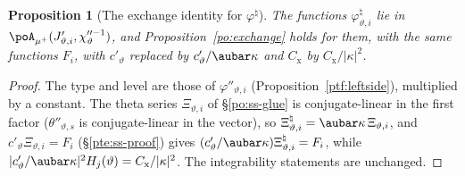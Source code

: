 \documentclass[10pt]{amsart}
\newtheorem{proposition}[theorem]{Proposition}
\theoremstyle{definition}
\theoremstyle{remark}
\begin{document}
\begin{proposition}[The exchange identity for $\varphi^\natural$]\label{pfq:exchange}
The functions $\varphi^\natural_{\vartheta,i}$ lie in $\poA_{\mu^+}(J'_{\vartheta,i},\chi''^{-1}_\vartheta)$, and Proposition~\ref{po:exchange} holds for
them, with the same functions $F_i$, with $c'_\vartheta$ replaced by $c'_\vartheta/\aubar\kappa$ and $C_{\mathrm x}$ by $C_{\mathrm x}/|\kappa|^2$.
\end{proposition}
\begin{proof}
The type and level are those of $\varphi''_{\vartheta,i}$ (Proposition~\ref{ptf:leftside}), multiplied by a constant. The theta series
$\Xi_{\vartheta,i}$ of \S\ref{po:ss-glue} is conjugate-linear in the first factor ($\theta''_{\vartheta,s}$ is conjugate-linear in the
vector), so $\Xi^\natural_{\vartheta,i}=\aubar\kappa\,\Xi_{\vartheta,i}$, and $c'_\vartheta\Xi_{\vartheta,i}=F_i$ (\S\ref{pte:ss-proof}) gives
$(c'_\vartheta/\aubar\kappa)\Xi^\natural_{\vartheta,i}=F_i$, while $|c'_\vartheta/\aubar\kappa|^2H_j(\vartheta)=C_{\mathrm x}/|\kappa|^2$. The integrability
statements are unchanged.
\end{proof}
\end{document}
